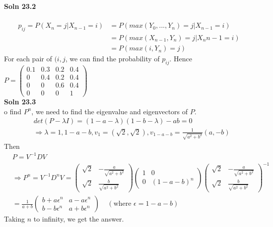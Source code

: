 \documentclass{article}
\newcommand{\SOL}[2]{%
  \textbf{Soln #1}\\%
}
\begin{document}
\SOL{23.2} \\
\\
\begin{align*}
p_{ij} = P(X_n = j | X_{n-1} = i) &= P(max(Y_0, ..., Y_n) = j | X_{n-1} = i) \\
  &= P(max(X_{n-1}, Y_n) = j | X_n{n-1} = i )  \\
  &= P(max(i, Y_n) = j) 
\end{align*}
For each pair of $(i, j$, we can find the probability of $p_{ij}$. Hence  $P = 
\begin{pmatrix}
   0.1 & 0.3 & 0.2 & 0.4 \\
   0 & 0.4 & 0.2&  0.4 \\
   0 & 0 & 0.6 & 0.4 \\
   0 & 0 & 0 &  1
\end{pmatrix}
$  \\
\SOL{23.3}
To find $P^n$, we need to find the eigenvalue and eigenvectors of $P$. 
\begin{align*}
	& det(P - \lambda I ) = (1-a - \lambda)(1-b-\lambda) - ab = 0 \\
	& \Rightarrow \lambda = 1, 1-a -b , v_1 = (\sqrt{2}, \sqrt{2}), v_{1-a-b} = \frac{1}{\sqrt{a^2+b^2}}(a, -b)
\end{align*}
Then 
\begin{align*}
& P  =V^{-1}DV \\
&\Rightarrow P^n = V^{-1}D^nV = 
\begin{pmatrix}
	\sqrt{2} &  -\frac{a}{\sqrt{a^2 +b^2}} \\
	\sqrt{2}  & \frac{b}{\sqrt{a^2+ b^2}}
\end{pmatrix} 
\begin{pmatrix}
	1 & 0 \\
	0 & (1-a-b)^n
\end{pmatrix}
\begin{pmatrix}
	\sqrt{2} &  -\frac{a}{\sqrt{a^2 +b^2}} \\
	\sqrt{2}  & \frac{b}{\sqrt{a^2+ b^2}}
\end{pmatrix}^{-1} \\
&= \frac{1}{a+b}
\begin{pmatrix}
  b + a \epsilon^n & a - a\epsilon^n \\
  b - b \epsilon^n & a + b\epsilon^n
\end{pmatrix} \ \ \ \ \   (\mbox{where } \epsilon = 1- a- b )
\end{align*}
Taking $n$ to infinity, we get the answer.
\end{document}
